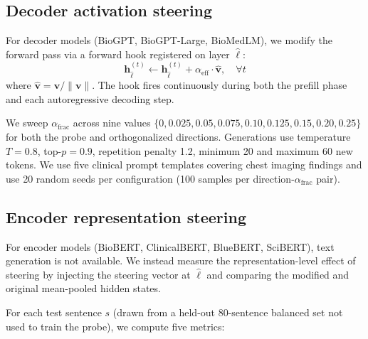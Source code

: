 \documentclass[11pt,a4paper]{article}
\begin{document}
\subsection{Decoder activation steering}

For decoder models (BioGPT, BioGPT-Large, BioMedLM), we modify the
forward pass via a forward hook registered on layer $\hat{\ell}$:
\begin{equation}
\mathbf{h}^{(t)}_{\hat{\ell}} \leftarrow
\mathbf{h}^{(t)}_{\hat{\ell}} + \alpha_{\text{eff}} \cdot \hat{\mathbf{v}},
\quad \forall t
\end{equation}
where $\hat{\mathbf{v}} = \mathbf{v}/\|\mathbf{v}\|$. The hook fires
continuously during both the prefill phase and each autoregressive
decoding step.

We sweep $\alpha_{\mathrm{frac}}$ across nine values
$\{0, 0.025, 0.05, 0.075, 0.10, 0.125, 0.15, 0.20, 0.25\}$ for both
the probe and orthogonalized directions. Generations use temperature
$T = 0.8$, top-$p = 0.9$, repetition penalty 1.2, minimum 20 and
maximum 60 new tokens. We use five clinical prompt templates covering
chest imaging findings and use 20 random seeds per configuration (100
samples per direction-$\alpha_{\mathrm{frac}}$ pair).

\subsection{Encoder representation steering}

For encoder models (BioBERT, ClinicalBERT, BlueBERT, SciBERT), text
generation is not available. We instead measure the representation-level
effect of steering by injecting the steering vector at $\hat{\ell}$ and
comparing the modified and original mean-pooled hidden states.

For each test sentence $s$ (drawn from a held-out 80-sentence balanced
set not used to train the probe), we compute five metrics:
\end{document}
